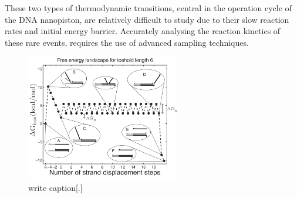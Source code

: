 These two types of thermodynamic transitions, central in the operation cycle of the DNA
nanopiston, are relatively difficult to study due to their slow reaction rates and
initial energy barrier. Accurately analysing the reaction kinetics of these rare events,
requires the use of advanced sampling techniques.

\begin{figure}[ht]
\begin{center}
  \includegraphics[width=0.6\textwidth]{Figures/ToeholdDiagram.png}
  \caption{write caption[.]}
\end{center}
\end{figure}


